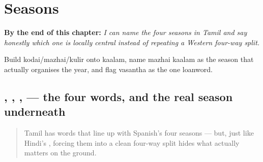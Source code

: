 
\chapter{Seasons}
\label{ch:ta-seasons}

\begin{chapteropening}
\textbf{By the end of this chapter:} \emph{I can name the four seasons in Tamil and say honestly which one is locally central instead of repeating a Western four-way split.}

Build kodai/mazhai/kulir onto kaalam, name mazhai kaalam as the season that actually organises the year, and flag vasantha as the one loanword.
\end{chapteropening}

\section[\texorpdfstring{\ta{வசந்த} \ta{காலம்} \ta{கோடைக்} … (vasantha kaalam …)}{வசந்த காலம் கோடைக் … (vasantha kaalam …)}]{ , , ,  — the four words, and the real season underneath}

\label{lesson:TA-C14-kaalangal}



\begin{quote}
Tamil has words that line up with Spanish's four seasons — but, just like Hindi's , forcing them into a clean four-way split hides what actually matters on the ground.
\end{quote}

